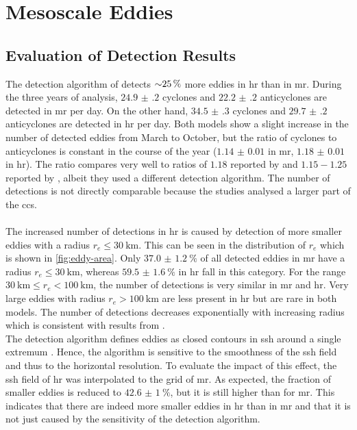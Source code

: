 \section{Mesoscale Eddies}\label{sec:mesoscale}

\subsection{Evaluation of Detection Results}\label{sec:mesoscale-detections}

The detection algorithm of \textcite{faghmous-2015} detects ${\sim} \SI{25}{\percent}$ more eddies in \ac{hr} than in \ac{mr}. During the three years of analysis, $\num[separate-uncertainty]{24.9(2)}$ cyclones and $\num[separate-uncertainty]{22.2(2)}$ anticyclones are detected in \ac{mr} per day. On the other hand, $\num[separate-uncertainty]{34.5(3)}$ cyclones and $\num[separate-uncertainty]{29.7(2)}$ anticyclones are detected in \ac{hr} per day. Both models show a slight increase in the number of detected eddies from March to October, but the ratio of cyclones to anticyclones is constant in the course of the year ($\num[separate-uncertainty]{1.14(1)}$ in \ac{mr}, $\num[separate-uncertainty]{1.18(1)}$ in \ac{hr}). The ratio compares very well to ratios of $1.18$ reported by \textcite[see their Figure 5]{kurian-2011-eddy-props} and $1.15 - 1.25$ reported by \textcite{nagai-2015-dom-role-meso}, albeit they used a different detection algorithm. The number of detections is not directly comparable because the studies analysed a larger part of the \ac{ccs}.\\
\\
The increased number of detections in \ac{hr} is caused by detection of more smaller eddies with a radius $r_e \le \SI{30}{\kilo\metre}$. This can be seen in the distribution of $r_e$ which is shown in \autoref{fig:eddy-area}. Only $\SI[separate-uncertainty]{37.0(12)}{\percent}$ of all detected eddies in \ac{mr} have a radius $r_e \le \SI{30}{\kilo\metre}$, whereas $\SI[separate-uncertainty]{59.5(16)}{\percent}$ in \ac{hr} fall in this category. For the range $\SI{30}{\kilo\metre} \le r_e <  \SI{100}{\kilo\metre}$, the number of detections is very similar in \ac{mr} and \ac{hr}. Very large eddies with radius $r_e > \SI{100}{\kilo\metre}$ are less present in \ac{hr} but are rare in both models. The number of detections decreases exponentially with increasing radius which is consistent with results from \textcite[see their Figure 5]{kurian-2011-eddy-props}.\\
The detection algorithm defines eddies as closed contours in \ac{ssh} around a single extremum \autocite{faghmous-2015}. Hence, the algorithm is sensitive to the smoothness of the \ac{ssh} field and thus to the horizontal resolution. To evaluate the impact of this effect, the \ac{ssh} field of \ac{hr} was interpolated to the grid of \ac{mr}. As expected, the fraction of smaller eddies is reduced to $\SI[separate-uncertainty]{42.6(10)}{\percent}$, but it is still higher than for \ac{mr}. This indicates that there are indeed more smaller eddies in \ac{hr} than in \ac{mr} and that it is not just caused by the sensitivity of the detection algorithm.\\

